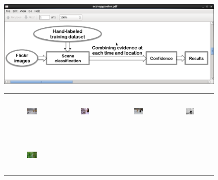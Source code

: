 \documentclass[10pt]{article}
\begin{document}
\begin{figure}[h]
\includegraphics[scale=.3]{figure/overview.png}
\end{figure}


\begin{figure}[th]
{\small{
\begin{center}
\begin{tabular}{@{}c@{\,\,\,}c@{\,\,\,}c@{\,\,\,}c@{\,\,\,}}
\includegraphics[width=0.19\textwidth, height=0.7in]{image/citysnow.jpg} &
\includegraphics[width=0.19\textwidth, height=0.7in]{image/citysnow2.jpg} &
\includegraphics[width=0.19\textwidth, height=0.7in]{image/dogsnow.jpg} &
\includegraphics[width=0.19\textwidth, height=0.7in]{image/humansnow.jpg} \\
\\[-6pt]
\hline
\\[-6pt]
\includegraphics[width=0.19\textwidth, height=0.7in]{image/intentiongreen.jpg} &

\end{tabular}
\end{center}}}
\end{figure}
\end{document}
